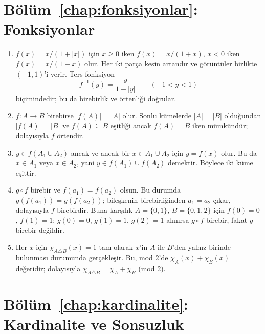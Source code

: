 \section{Bölüm~\ref{chap:fonksiyonlar}: Fonksiyonlar}

\begin{enumerate}
\item $f(x)=x/(1+|x|)$ için $x\geq0$ iken $f(x)=x/(1+x)$, $x<0$ iken $f(x)=x/(1-x)$ olur. Her iki parça kesin artandır ve görüntüler birlikte $(-1,1)$'i verir. Ters fonksiyon
\[
f^{-1}(y)=\frac{y}{1-|y|}\qquad(-1<y<1)
\]
biçimindedir; bu da birebirlik ve örtenliği doğrular.

\item $f:A\to B$ birebirse $|f(A)|=|A|$ olur. Sonlu kümelerde $|A|=|B|$ olduğundan $|f(A)|=|B|$ ve $f(A)\subseteq B$ eşitliği ancak $f(A)=B$ iken mümkündür; dolayısıyla $f$ örtendir.

\item $y\in f(A_1\cup A_2)$ ancak ve ancak bir $x\in A_1\cup A_2$ için $y=f(x)$ olur. Bu da $x\in A_1$ veya $x\in A_2$, yani $y\in f(A_1)\cup f(A_2)$ demektir. Böylece iki küme eşittir.

\item $g\circ f$ birebir ve $f(a_1)=f(a_2)$ olsun. Bu durumda $g(f(a_1))=g(f(a_2))$; bileşkenin birebirliğinden $a_1=a_2$ çıkar, dolayısıyla $f$ birebirdir. Buna karşılık $A=\{0,1\}$, $B=\{0,1,2\}$ için $f(0)=0$, $f(1)=1$; $g(0)=0$, $g(1)=1$, $g(2)=1$ alınırsa $g\circ f$ birebir, fakat $g$ birebir değildir.

\item Her $x$ için $\chi_{A\triangle B}(x)=1$ tam olarak $x$'in $A$ ile $B$'den yalnız birinde bulunması durumunda gerçekleşir. Bu, mod 2'de $\chi_A(x)+\chi_B(x)$ değeridir; dolayısıyla $\chi_{A\triangle B}=\chi_A+\chi_B$ (mod 2).
\end{enumerate}

\section{Bölüm~\ref{chap:kardinalite}: Kardinalite ve Sonsuzluk}

